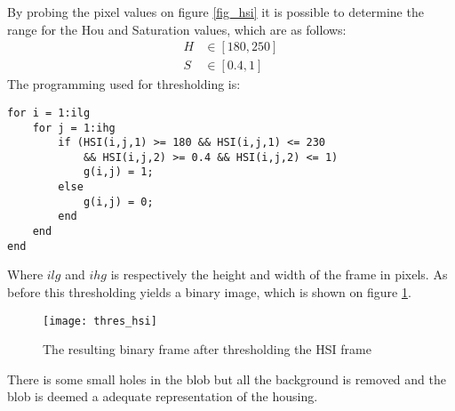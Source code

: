By probing the pixel values on figure \ref{fig_hsi} it is possible to determine the range for the Hou and Saturation values, which are as follows:
\begin{align}
H&\in[180,250]\\
S&\in[0.4,1]	
\end{align}
The programming used for thresholding is:
\begin{lstlisting}
for i = 1:ilg
	for j = 1:ihg
		if (HSI(i,j,1) >= 180 && HSI(i,j,1) <= 230  
		    && HSI(i,j,2) >= 0.4 && HSI(i,j,2) <= 1)
			g(i,j) = 1;
		else 
			g(i,j) = 0;
		end
	end
end
\end{lstlisting}
Where $ilg$ and $ihg$ is respectively the height and width of the frame in pixels. As before this thresholding yields a binary image, which is shown on figure \ref{fig_bin_hsi}. \clearpage
\begin{figure}[htbp!]
	\centering
	\texttt{[image: thres\_hsi]}
	\caption{The resulting binary frame after thresholding the HSI frame}
	\label{fig_bin_hsi}
\end{figure}
\noindent There is some small holes in the blob but all the background is removed and the blob is deemed a adequate representation of the housing. 
